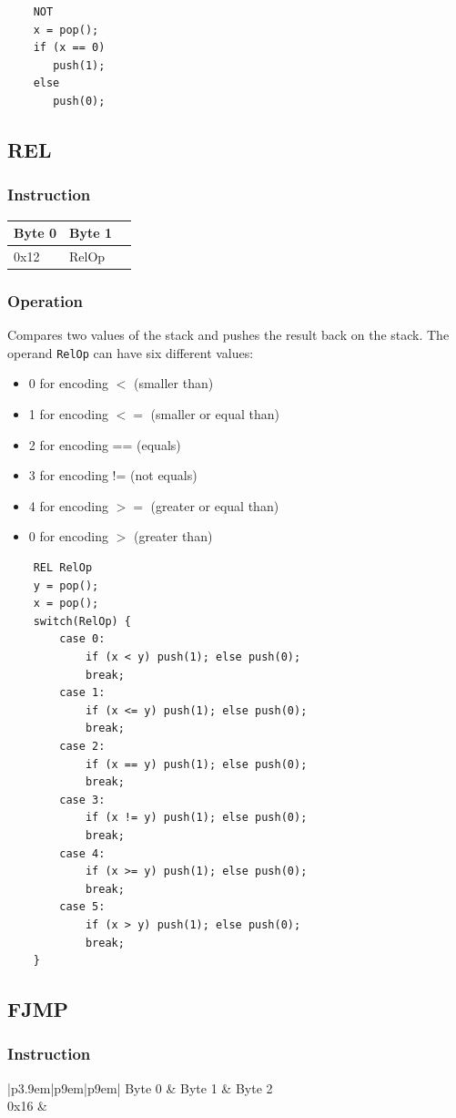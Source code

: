 \documentclass[11pt]{report}
\newcommand{\twobyteinstruction}[2]{
\begin{tabular}{|p{3.9em}|p{9em}|p{9em}|}
\hline
\tiny{Byte 0} & \tiny{Byte 1} \\ \hline
#1 & #2 \\ \hline
\end{tabular}
}
\newcommand{\threebyteinstruction}[2]{
\begin{tabular}{|p{3.9em}|p{9em}|p{9em}|}
\hline
\tiny{Byte 0} & \tiny{Byte 1} & \tiny{Byte 2} \\ \hline
#1 & \multicolumn{2}{c |}{#2} \\ \hline
\end{tabular}
}
\begin{document}
	\begin{lstlisting}
	NOT
	x = pop();
	if (x == 0)
	   push(1);
	else
	   push(0);
	\end{lstlisting}

\subsection{REL}
\subsubsection{Instruction}
\twobyteinstruction{0x12}{RelOp}

\subsubsection{Operation}
Compares two values of the stack and pushes the result back on the stack. The operand \lstinline$RelOp$ can have six different values:
\begin{itemize}
	\item 0 for encoding $<$ (smaller than)
	\item 1 for encoding $<=$ (smaller or equal than)
	\item 2 for encoding == (equals)
	\item 3 for encoding != (not equals)
	\item 4 for encoding $>=$ (greater or equal than)
	\item 0 for encoding $>$ (greater than)
\end{itemize}
	\begin{lstlisting}
	REL RelOp
	y = pop();
	x = pop();
	switch(RelOp) {
		case 0:
			if (x < y) push(1); else push(0);
			break;
		case 1:
			if (x <= y) push(1); else push(0);
			break;
		case 2:
			if (x == y) push(1); else push(0);
			break;
		case 3:
			if (x != y) push(1); else push(0);
			break;
		case 4:
			if (x >= y) push(1); else push(0);
			break;
		case 5:
			if (x > y) push(1); else push(0);
			break;
	}
	\end{lstlisting}

\subsection{FJMP}
\subsubsection{Instruction}
\threebyteinstruction{0x16}{NewPc}
\end{document}
